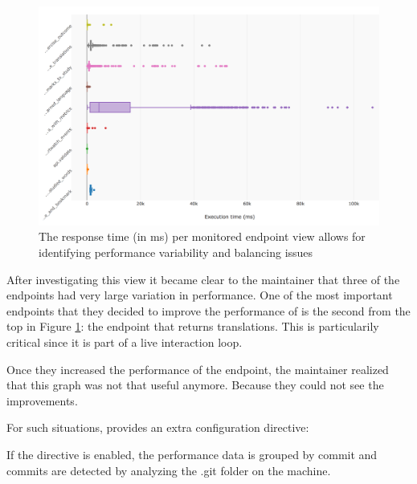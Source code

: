 \documentclass[conference]{IEEEtran}
\begin{document}

  \begin{figure}[h!]
    \centering
    \includegraphics[width=\linewidth]{endpoint_performance.png}
    \caption{The response time (in ms) per monitored endpoint view allows for identifying performance variability and balancing issues}
    \label{fig:ep}
  \end{figure}

  After investigating this view it became clear to the maintainer that three of the endpoints had very large variation in performance. One of the most important endpoints that they decided to improve the performance of is the second from the top in Figure \ref{fig:ep}: the endpoint that returns translations. This is particularily critical since it is part of a live interaction loop. 

  \niceseparator

  Once they increased the performance of the endpoint, the maintainer realized that this graph was not that useful anymore. Because they could not see the improvements. 

  For such situations, \tool provides an extra configuration directive:


  If the directive is enabled, the performance data is grouped by commit and commits are detected by analyzing the .git folder on the machine. 
\end{document}
